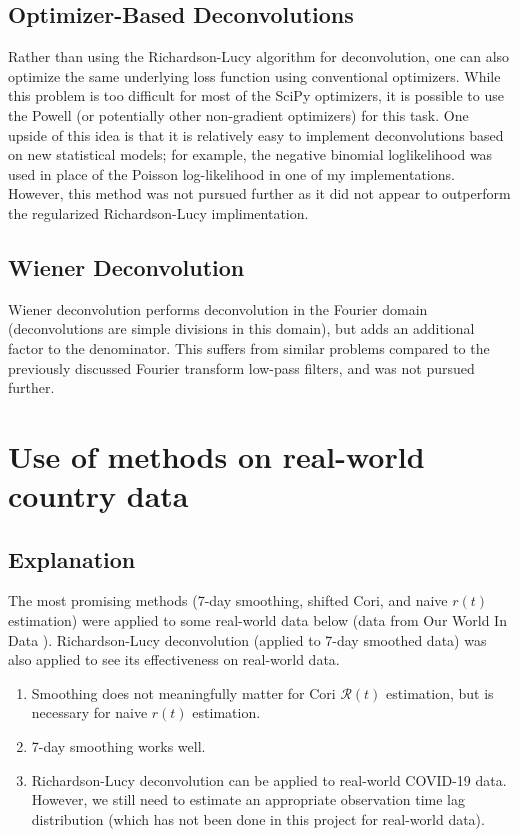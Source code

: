 \documentclass{article}
\newcommand{\nR}{\mathcal{R}}
\newcommand{\nr}{r}
\begin{document}
\subsection{Optimizer-Based Deconvolutions}
Rather than using the Richardson-Lucy algorithm for deconvolution, one can also optimize the same underlying loss function using conventional optimizers. While this problem is too difficult for most of the SciPy optimizers, it is possible to use the Powell (or potentially other non-gradient optimizers) for this task. One upside of this idea is that it is relatively easy to implement deconvolutions based on new statistical models; for example, the negative binomial loglikelihood was used in place of the Poisson log-likelihood in one of my implementations. However, this method was not pursued further as it did not appear to outperform the regularized Richardson-Lucy implimentation.

\subsection{Wiener Deconvolution}
Wiener deconvolution performs deconvolution in the Fourier domain (deconvolutions are simple divisions in this domain), but adds an additional factor to the denominator. This suffers from similar problems compared to the previously discussed Fourier transform low-pass filters, and was not pursued further.

\section{Use of methods on real-world country data}
\subsection{Explanation}
The most promising methods (7-day smoothing, shifted Cori, and naive $\nr(t)$ estimation) were applied to some real-world data below (data from Our World In Data \cite{OWID}).  Richardson-Lucy deconvolution (applied to 7-day smoothed data) was also applied to see its effectiveness on real-world data.

\begin{enumerate}
    \item Smoothing does not meaningfully matter for Cori $\nR(t)$ estimation, but is necessary for naive $\nr(t)$ estimation.
    \item 7-day smoothing works well. 
    \item Richardson-Lucy deconvolution can be applied to real-world COVID-19 data. However, we still need to estimate an appropriate observation time lag distribution (which has not been done in this project for real-world data).
\end{enumerate}
\end{document}
